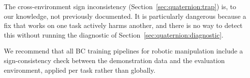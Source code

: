The cross-environment sign inconsistency (Section~\ref{sec:quaternion:trap}) is, to our knowledge, not previously documented. It is particularly dangerous because a fix that works on one task actively harms another, and there is no way to detect this without running the diagnostic of Section~\ref{sec:quaternion:diagnostic}.

We recommend that all BC training pipelines for robotic manipulation include a sign-consistency check between the demonstration data and the evaluation environment, applied per task rather than globally.
